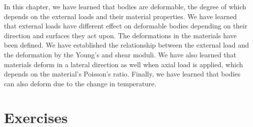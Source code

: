 \documentclass[
10pt,
a4paper,
openany,
svgnames,
]{kaobook} %
\begin{document}
In this chapter, we have learned that bodies are deformable, the degree of which depends on the external loads and their material properties. We have learned that external loads have different effect on deformable bodies depending on their direction and surfaces they act upon. The deformations in the materials have been defined. We have established the relationship between the external load and the deformation by the Young’s and shear moduli. We have also learned that materials deform in a lateral direction as well when axial load is applied, which depends on the material’s Poisson’s ratio. Finally, we have learned that bodies can also deform due to the change in temperature.

\section*{Exercises}
\end{document}
